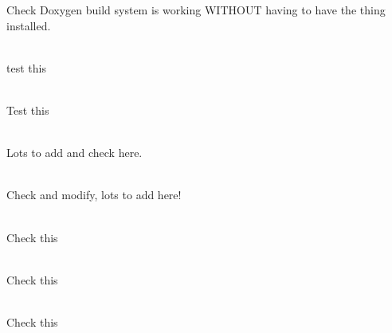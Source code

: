 \begin{DoxyRefList}
Check Doxygen build system is working WITHOUT having to have the thing installed.  
\item[Member \doxylink{class_d_c_l_1_1_c_a_a_b_b_adf471db9b9b4619a081a4a24890da4fa}{DCL\+::CAABB\+::get\+AABBintersects} (const \doxylink{class_d_c_l_1_1_c_a_a_b_b}{CAABB} \&aabb) const]\hfill \\
\label{todo__todo000007}%
%
test this  
\item[Member \doxylink{class_d_c_l_1_1_c_a_a_b_b_aa29257d72c836033ae6da2801f460042}{DCL\+::CAABB\+::resize\+Area} (float f\+Multiplier)]\hfill \\
\label{todo__todo000008}%
%
Test this 
\item[Class \doxylink{class_d_c_l_1_1_c_audio_manager}{DCL\+::CAudio\+Manager} ]\hfill \\
\label{todo__todo000003}%
%
Lots to add and check here.  
\item[Class \doxylink{class_d_c_l_1_1_c_file_manager}{DCL\+::CFile\+Manager} ]\hfill \\
\label{todo__todo000005}%
%
Check and modify, lots to add here!  
\item[Member \doxylink{class_d_c_l_1_1_c_frustum_af5f03f2e4eaed3447b7aeb19c2e26e51}{DCL\+::CFrustum\+::compute\+From\+View\+Projection} (const \doxylink{class_d_c_l_1_1_c_matrix}{CMatrix} \&camera\+View\+Matrix, const \doxylink{class_d_c_l_1_1_c_matrix}{CMatrix} \&camera\+Projection\+Matrix)]\hfill \\
\label{todo__todo000009}%
%
Check this  
\item[Member \doxylink{class_d_c_l_1_1_c_frustum_a2f7123cd1cc6439dfa2d79060ca5dc5e}{DCL\+::CFrustum\+::is\+AABBIntersecting} (const \doxylink{class_d_c_l_1_1_c_a_a_b_b}{CAABB} \&aabb) const]\hfill \\
\label{todo__todo000011}%
%
Check this  
\item[Member \doxylink{class_d_c_l_1_1_c_frustum_a3c827a97cf9db0ef176880246745ff42}{DCL\+::CFrustum\+::is\+Point\+Inside} (const \doxylink{class_d_c_l_1_1_c_vector3f}{CVector3f} \&v\+Position) const]\hfill \\
\label{todo__todo000010}%
%
Check this  
\item[Class \doxylink{class_d_c_l_1_1_c_genetics_training}{DCL\+::CGenetics\+Training} ]\hfill \\
\label{todo__todo000002}%

\end{DoxyRefList}
